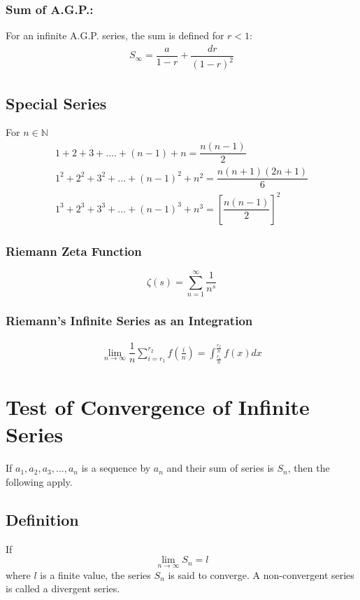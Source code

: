 \documentclass[openany, oneside]{book}
\begin{document}
\subsection{Sum of A.G.P.:}
For an infinite A.G.P. series, the sum is defined for $r<1$:
\begin{align}
S_\infty=\dfrac{a}{1-r}+\dfrac{dr}{(1-r)^2}
\end{align}

\section{Special Series}
For $n\in\mathbb{N}$
\begin{align}
1+2+3+....+(n-1)+n=\dfrac{n(n-1)}{2}\\
1^2+2^2+3^2+...+(n-1)^2+n^2=\dfrac{n(n+1)(2n+1)}{6}\\
1^3+2^3+3^3+...+(n-1)^3+n^3=[\dfrac{n(n-1)}{2}]^2
\end{align}
\subsection{Riemann Zeta Function}
\begin{equation}
\zeta(s)=\sum_{n=1}^\infty \dfrac{1}{n^s}
\end{equation}
\subsection{Riemann's Infinite Series as an Integration}
\label{riemannsum}
\begin{align}
\lim_{n\to\infty} \dfrac{1}{n}\sum_{i=r_1}^{r_2} f(\frac{i}{n})=\int_{\frac{r_1}{n}}^{\frac{r_2}{n}} f(x) dx
\end{align}

\large{\chapter{Test of Convergence of Infinite Series}}
If $a_1,a_2,a_3,...,a_n$ is a sequence by $a_n$ and their sum of series is $S_n$, then the following apply.
\section{Definition}
If \begin{equation}\lim_{n\to\infty} S_n=l\nonumber\end{equation} where $l$ is a finite value, the series $S_n$ is said to converge. A non-convergent series is called a divergent series.
\end{document}
